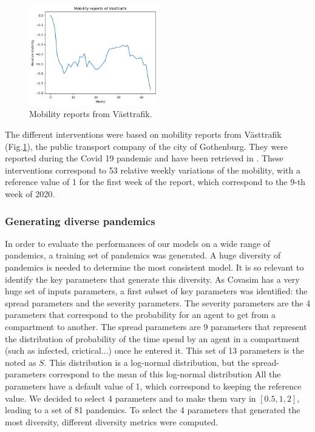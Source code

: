 \begin{figure}
    \centering
    \includegraphics[width=0.5\textwidth]{figures/mobility_reports.png}
    \caption{Mobility reports from Västtrafik.}
    \label{fig:mobility_reports}
\end{figure}


The different interventions were based on mobility reports from Västtrafik (Fig.\ref{fig:mobility_reports}), the public transport company of the city of Gothenburg. 
They were reported during the Covid 19 pandemic and have been retrieved in \cite{gerlee2021predicting}.
These interventions correspond to 53 relative weekly variations of the mobility, with a reference value of 1 for the first week of the report, which correspond to the 9-th week of 2020. 


\subsubsection{Generating diverse pandemics}
\label{sec:generating_divserse_pandemics}
In order to evaluate the performances of our models on a wide range of pandemics, a training set of pandemics was generated. 
A huge diversity of pandemics is needed to determine the most consistent model.
It is so relevant to identify the key parameters that generate this diversity.
As Covasim has a very huge set of inputs parameters, a first subset of key parameters was identified: the spread parameters and the severity parameters. 
The severity parameters are the 4 parameters that correspond to the probability for an agent to get from a compartment to another. 
The spread parameters are 9 parameters that represent the distribution of probability of the time spend by an agent in a compartment (such as infected, crictical...) once he entered it. 
This set of 13 parameters is the noted as $S$. 
This distribution is a log-normal distribution, but the spread-parameters correspond to the mean of this log-normal distribution
All the parameters have a default value of 1, which correspond to keeping the reference value. 
We decided to select 4 parameters and to make them vary in $[0.5, 1, 2]$, leading to a set of 81 pandemics. 
To select the 4 parameters that generated the most diversity, different diversity metrics were computed. 

